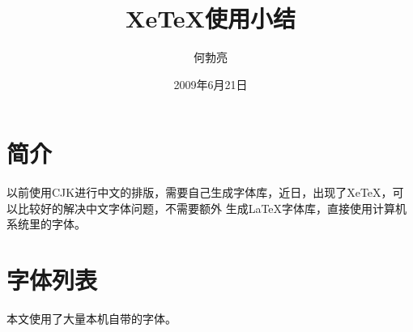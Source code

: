 \documentclass[12pt,a4paper]{article}
\begin{document}
\title{\whei XeTeX使用小结}
\author{\fsong 何勃亮}
\date{\kai2009年6月21日}

\maketitle

\section{简介}
以前使用CJK进行中文的排版，需要自己生成字体库，近日，出现了XeTeX，可以比较好的解决中文字体问题，不需要额外
生成LaTeX字体库，直接使用计算机系统里的字体。

\section{字体列表}
本文使用了大量本机自带的字体。
\end{document}
